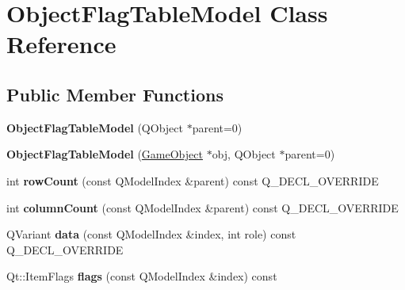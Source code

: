 \hypertarget{class_object_flag_table_model}{\section{\-Object\-Flag\-Table\-Model \-Class \-Reference}
\label{class_object_flag_table_model}
}
\subsection*{\-Public \-Member \-Functions}
\begin{DoxyCompactItemize}
\item 
\hypertarget{class_object_flag_table_model_af93cda07e36e59b974c4bdb49d0141a3}{{\bfseries \-Object\-Flag\-Table\-Model} (\-Q\-Object $\ast$parent=0)}\label{class_object_flag_table_model_af93cda07e36e59b974c4bdb49d0141a3}

\item 
\hypertarget{class_object_flag_table_model_a0262c5ecc3313c3d803ce24ec6378080}{{\bfseries \-Object\-Flag\-Table\-Model} (\hyperlink{class_game_object}{\-Game\-Object} $\ast$obj, \-Q\-Object $\ast$parent=0)}\label{class_object_flag_table_model_a0262c5ecc3313c3d803ce24ec6378080}

\item 
\hypertarget{class_object_flag_table_model_a2c62cafdcddc9a64dac28baabbc3a233}{int {\bfseries row\-Count} (const \-Q\-Model\-Index \&parent) const \-Q\-\_\-\-D\-E\-C\-L\-\_\-\-O\-V\-E\-R\-R\-I\-D\-E}\label{class_object_flag_table_model_a2c62cafdcddc9a64dac28baabbc3a233}

\item 
\hypertarget{class_object_flag_table_model_a1ee21132633db3b8f5b14bdd223c9b43}{int {\bfseries column\-Count} (const \-Q\-Model\-Index \&parent) const \-Q\-\_\-\-D\-E\-C\-L\-\_\-\-O\-V\-E\-R\-R\-I\-D\-E}\label{class_object_flag_table_model_a1ee21132633db3b8f5b14bdd223c9b43}

\item 
\hypertarget{class_object_flag_table_model_a2eee998c6159d124e9bdf3334f21660a}{\-Q\-Variant {\bfseries data} (const \-Q\-Model\-Index \&index, int role) const \-Q\-\_\-\-D\-E\-C\-L\-\_\-\-O\-V\-E\-R\-R\-I\-D\-E}\label{class_object_flag_table_model_a2eee998c6159d124e9bdf3334f21660a}

\item 
\hypertarget{class_object_flag_table_model_a20a47ee2abd063c1fdcb86faf0dc45e5}{\-Qt\-::\-Item\-Flags {\bfseries flags} (const \-Q\-Model\-Index \&index) const }\label{class_object_flag_table_model_a20a47ee2abd063c1fdcb86faf0dc45e5}


\end{DoxyCompactItemize}
